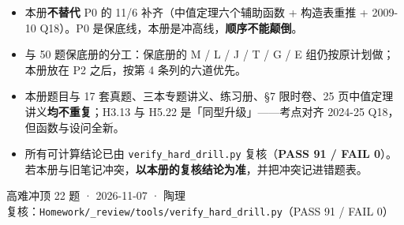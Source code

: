 \documentclass[11pt,a4paper]{ctexart}
\begin{document}
\begin{warnbox}[本册与今天其余材料的关系]
\begin{itemize}
\item 本册\textbf{不替代} P0 的 11/6 补齐（中值定理六个辅助函数 + 构造表重推 + 2009-10 Q18）。P0 是保底线，本册是冲高线，\textbf{顺序不能颠倒}。
\item 与 50 题保底册的分工：保底册的 M / L / J / T / G / E 组仍按原计划做；本册放在 P2 之后，按第 4 条列的六道优先。
\item 本册题目与 17 套真题、三本专题讲义、练习册、\S 7 限时卷、25 页中值定理讲义\textbf{均不重复}；H3.13 与 H5.22 是「同型升级」——考点对齐 2024-25 Q18，但函数与设问全新。
\item 所有可计算结论已由 \texttt{verify\_hard\_drill.py} 复核（\textbf{PASS 91 / FAIL 0}）。若本册与旧笔记冲突，\textbf{以本册的复核结论为准}，并把冲突记进错题表。
\end{itemize}
\end{warnbox}

\vspace{1.5em}
\begin{center}
{\small 高难冲顶 22 题 · 2026-11-07 · 陶理\\[2pt]
复核：\texttt{Homework/\_review/tools/verify\_hard\_drill.py}（PASS 91 / FAIL 0）}
\end{center}
\end{document}
